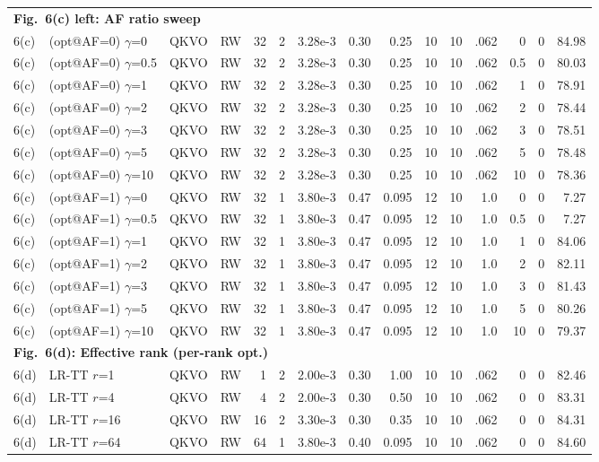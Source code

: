 \documentclass[AMA,LATO1COL]{WileyNJDv5}
\begin{document}
{\begin{longtable}{@{}l l l l r r r r r r r r r r r@{}}
\multicolumn{15}{l}{\cellcolor{HeadGray}\textbf{Fig.~6(c) left: AF ratio sweep}} \\
6(c) & (opt@AF=0) $\gamma$=0 & QKVO & RW & 32 & 2 & 3.28e-3 & 0.30 & 0.25 & 10 & 10 & .062 & 0 & 0 & 84.98 \\
6(c) & (opt@AF=0) $\gamma$=0.5 & QKVO & RW & 32 & 2 & 3.28e-3 & 0.30 & 0.25 & 10 & 10 & .062 & 0.5 & 0 & 80.03 \\
6(c) & (opt@AF=0) $\gamma$=1 & QKVO & RW & 32 & 2 & 3.28e-3 & 0.30 & 0.25 & 10 & 10 & .062 & 1 & 0 & 78.91 \\
6(c) & (opt@AF=0) $\gamma$=2 & QKVO & RW & 32 & 2 & 3.28e-3 & 0.30 & 0.25 & 10 & 10 & .062 & 2 & 0 & 78.44 \\
6(c) & (opt@AF=0) $\gamma$=3 & QKVO & RW & 32 & 2 & 3.28e-3 & 0.30 & 0.25 & 10 & 10 & .062 & 3 & 0 & 78.51 \\
6(c) & (opt@AF=0) $\gamma$=5 & QKVO & RW & 32 & 2 & 3.28e-3 & 0.30 & 0.25 & 10 & 10 & .062 & 5 & 0 & 78.48 \\
6(c) & (opt@AF=0) $\gamma$=10 & QKVO & RW & 32 & 2 & 3.28e-3 & 0.30 & 0.25 & 10 & 10 & .062 & 10 & 0 & 78.36 \\
6(c) & (opt@AF=1) $\gamma$=0 & QKVO & RW & 32 & 1 & 3.80e-3 & 0.47 & 0.095 & 12 & 10 & 1.0 & 0 & 0 & 7.27 \\
6(c) & (opt@AF=1) $\gamma$=0.5 & QKVO & RW & 32 & 1 & 3.80e-3 & 0.47 & 0.095 & 12 & 10 & 1.0 & 0.5 & 0 & 7.27 \\
6(c) & (opt@AF=1) $\gamma$=1 & QKVO & RW & 32 & 1 & 3.80e-3 & 0.47 & 0.095 & 12 & 10 & 1.0 & 1 & 0 & 84.06 \\
6(c) & (opt@AF=1) $\gamma$=2 & QKVO & RW & 32 & 1 & 3.80e-3 & 0.47 & 0.095 & 12 & 10 & 1.0 & 2 & 0 & 82.11 \\
6(c) & (opt@AF=1) $\gamma$=3 & QKVO & RW & 32 & 1 & 3.80e-3 & 0.47 & 0.095 & 12 & 10 & 1.0 & 3 & 0 & 81.43 \\
6(c) & (opt@AF=1) $\gamma$=5 & QKVO & RW & 32 & 1 & 3.80e-3 & 0.47 & 0.095 & 12 & 10 & 1.0 & 5 & 0 & 80.26 \\
6(c) & (opt@AF=1) $\gamma$=10 & QKVO & RW & 32 & 1 & 3.80e-3 & 0.47 & 0.095 & 12 & 10 & 1.0 & 10 & 0 & 79.37 \\
\midrule

\multicolumn{15}{l}{\cellcolor{HeadGray}\textbf{Fig.~6(d): Effective rank (per-rank opt.)}} \\
6(d) & LR-TT $r$=1 & QKVO & RW & 1 & 2 & 2.00e-3 & 0.30 & 1.00 & 10 & 10 & .062 & 0 & 0 & 82.46 \\
6(d) & LR-TT $r$=4 & QKVO & RW & 4 & 2 & 2.00e-3 & 0.30 & 0.50 & 10 & 10 & .062 & 0 & 0 & 83.31 \\
6(d) & LR-TT $r$=16 & QKVO & RW & 16 & 2 & 3.30e-3 & 0.30 & 0.35 & 10 & 10 & .062 & 0 & 0 & 84.31 \\
6(d) & LR-TT $r$=64 & QKVO & RW & 64 & 1 & 3.80e-3 & 0.40 & 0.095 & 10 & 10 & .062 & 0 & 0 & 84.60 \\
\midrule


\end{longtable}}
\end{document}
